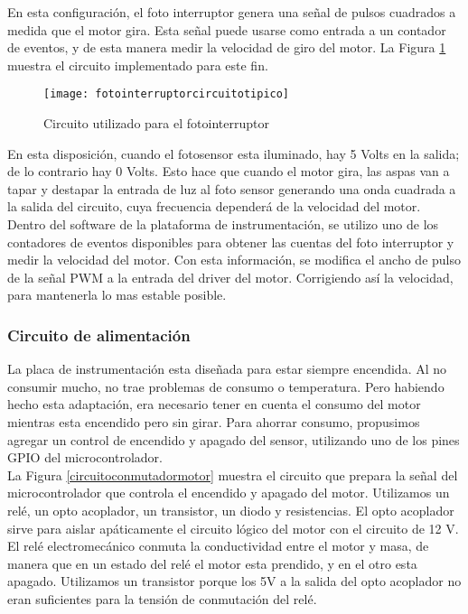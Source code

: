 En esta configuración, el foto interruptor genera una señal de pulsos cuadrados a medida que el motor gira. Esta señal puede usarse como entrada a un contador de eventos, y de esta manera medir la velocidad de giro del motor. La Figura \ref{fig:fotointerruptorcircuitotipico} muestra el circuito implementado para este fin. 

\begin{figure}[h]
  \centering
  \texttt{[image: fotointerruptorcircuitotipico]}
  \caption{Circuito utilizado para el fotointerruptor}\label{fig:fotointerruptorcircuitotipico}
\end{figure}

En esta disposición, cuando el fotosensor esta iluminado, hay 5 Volts en la salida; de lo contrario hay 0 Volts. Esto hace que cuando el motor gira, las aspas van a tapar y destapar la entrada de luz al foto sensor generando una onda cuadrada a la salida del circuito, cuya frecuencia dependerá de la velocidad del motor. Dentro del software de la plataforma de instrumentación, se utilizo uno de los contadores de eventos disponibles para obtener las cuentas del foto interruptor y medir la velocidad del motor. Con esta información, se modifica el ancho de pulso de la señal PWM a la entrada del driver del motor. Corrigiendo así la velocidad, para mantenerla lo mas estable posible. 


\subsubsection{Circuito de alimentación} %
\label{it6:ssub:circuito_de_alimentacion}

La placa de instrumentación esta diseñada para estar siempre encendida. Al no consumir mucho, no trae problemas de consumo o temperatura. Pero habiendo hecho esta adaptación, era necesario tener en cuenta el consumo del motor mientras esta encendido pero sin girar. Para ahorrar consumo, propusimos agregar un control de encendido y apagado del sensor, utilizando uno de los pines GPIO del microcontrolador. \\

La Figura \ref{circuitoconmutadormotor} muestra el circuito que prepara la señal del microcontrolador que controla el encendido y apagado del motor. Utilizamos un relé, un opto acoplador, un transistor, un diodo y resistencias. El opto acoplador sirve para aislar apáticamente el circuito lógico del motor con el circuito de 12 V. El relé electromecánico conmuta la conductividad entre el motor y masa, de manera que en un estado del relé el motor esta prendido, y en el otro esta apagado. Utilizamos un transistor porque los 5V a la salida del opto acoplador no eran suficientes para la tensión de conmutación del relé.

